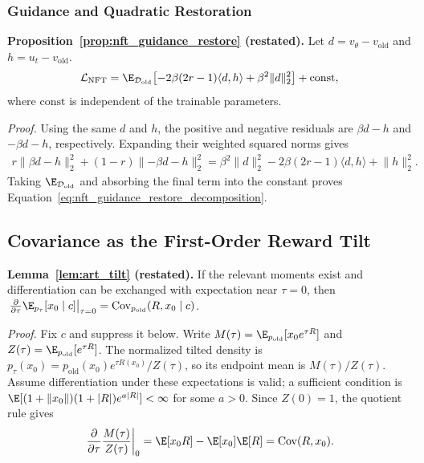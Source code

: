 \documentclass{article}
\begin{document}
\subsubsection{Guidance and Quadratic Restoration}
\noindent\textbf{Proposition~\ref{prop:nft_guidance_restore} (restated).} Let $d=v_\theta-v_{\mathrm{old}}$ and $h=u_t-v_{\mathrm{old}}$.
\begin{equation*}
\mathcal L_{\mathrm{NFT}}
=\E_{\mathcal D_{\mathrm{old}}}\!\left[-2\beta(2r-1)
\langle d,h\rangle
+\beta^2\lVert d\rVert_2^2\right]+\mathrm{const},
\end{equation*}
where $\mathrm{const}$ is independent of the trainable parameters.

\noindent\textit{Proof.} 
Using the same $d$ and $h$, the positive and negative residuals are
$\beta d-h$ and $-\beta d-h$, respectively. Expanding their weighted squared
norms gives
\begin{align}
r\lVert\beta d-h\rVert_2^2
+(1-r)\lVert-\beta d-h\rVert_2^2
=\beta^2\lVert d\rVert_2^2
-2\beta(2r-1)\langle d,h\rangle
+\lVert h\rVert_2^2.
\end{align}
Taking $\E_{\mathcal D_{\mathrm{old}}}$ and absorbing the final term into the constant proves
Equation~\ref{eq:nft_guidance_restore_decomposition}.

\subsection{Covariance as the First-Order Reward Tilt}
\label{app:art_details}
\noindent\textbf{Lemma~\ref{lem:art_tilt} (restated).}
If the relevant moments exist and differentiation can be
exchanged with expectation near $\tau=0$, then
$\left.\frac{\partial}{\partial\tau}\E_{p_\tau}[x_0\mid c]\right|_{\tau=0}
=\operatorname{Cov}_{p_{\mathrm{old}}}(R,x_0\mid c)$.

\noindent\textit{Proof.} 
Fix $c$ and suppress it below. Write
$M(\tau)=\E_{p_{\mathrm{old}}}[x_0e^{\tau R}]$ and
$Z(\tau)=\E_{p_{\mathrm{old}}}[e^{\tau R}]$.
The normalized tilted density is $p_\tau(x_0)=p_{\mathrm{old}}(x_0)e^{\tau R(x_0)}/Z(\tau)$,
so its endpoint mean is $M(\tau)/Z(\tau)$.
Assume differentiation under these expectations is valid; a sufficient
condition is $\E[(1+\lVert x_0\rVert)(1+|R|)e^{a|R|}]<\infty$
for some $a>0$. Since $Z(0)=1$, the quotient rule gives
\begin{equation}
\left.\frac{\partial}{\partial\tau}\frac{M(\tau)}{Z(\tau)}\right|_0
=\E[x_0R]-\E[x_0]\E[R]
=\operatorname{Cov}(R,x_0).
\end{equation}
\end{document}

